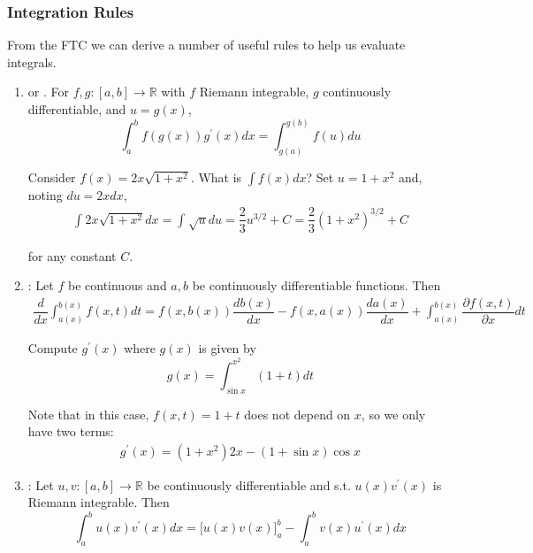 \documentclass{article}
\begin{document}
\subsubsection{Integration Rules}
\label{ssub:integration_rules}

From the FTC we can derive a number of useful rules to help us evaluate integrals.
\begin{enumerate}
  \item {} or . For $f, g: [a, b] \to \mathbb{R}$ with $f$ Riemann integrable, $g$ continuously differentiable, and $u = g(x)$,
    \[
      \int_{a}^{b} f(g(x)) g^\prime(x) dx
      =
      \int_{g(a)}^{g(b)} f(u) du
    \]

    \begin{example}
      Consider $f(x) = 2x \sqrt{1 + x^2}$. What is $\int f(x) dx$? Set $u = 1 + x^2$ and, noting $du = 2x dx$,
      \begin{align*}
        \int_{}^{} 2x \sqrt{1 + x^2} dx
        =
        \int_{}^{} \sqrt{u} du
        =
        \dfrac{2}{3} u^{3/2} + C
        =
        \dfrac{2}{3} \left(1 + x^2\right)^{3/2} + C
      \end{align*}

      for any constant $C$.
    \end{example}

  \item {}: Let $f$ be continuous and $a, b$ be continuously differentiable functions. Then
    \begin{align*}
      \dfrac{d}{dx} \int_{a(x)}^{b(x)} f(x, t) dt
      =
      f(x, b(x)) \dfrac{db(x)}{dx}
      -
      f(x, a(x)) \dfrac{da(x)}{dx}
      +
      \int_{a(x)}^{b(x)}
      \dfrac{\partial f(x, t)}{\partial x} dt
    \end{align*}

    \begin{example}
      Compute $g^\prime(x)$ where $g(x)$ is given by
      \[
        g(x) = \int_{\sin x}^{x^2} (1 + t) dt
      \]

      Note that in this case, $f(x, t) = 1 + t$ does not depend  on $x$, so we only have two terms:
      \begin{align*}
        g^\prime(x)
        =
        (1 + x^2) 2x
        -
        (1 + \sin x) \cos x
      \end{align*}
    \end{example}

  \item {}: Let $u, v: [a, b] \to \mathbb{R}$ be continuously differentiable and s.t. $u(x) v^\prime(x)$ is Riemann integrable. Then
    \[
      \int_{a}^{b} u(x) v^\prime(x) dx
      =
      \Big[
        u(x) v(x)
      \Big]_{a}^b
      -
      \int_{a}^{b} v(x) u^\prime(x) dx
    \]


\end{enumerate}
\end{document}
